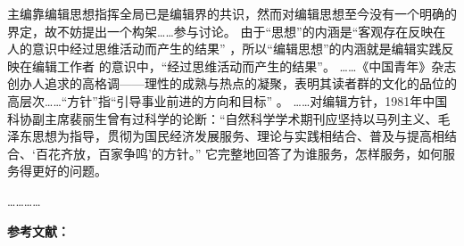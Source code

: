 \documentclass{article}
\newlength{\indentedpara}
\begin{document}
\pdfpagewidth=21cm \pdfpageheight=9.15cm
\begin{refsection}
\nocite{裴丽生1981-2-10,刘彻东1998-38-39,张忠智1997-33-34,中国社会科学院语言研究所词典编辑室1996--}

主编靠编辑思想指挥全局已是编辑界的共识\cite{张忠智1997-33-34}，然而对编辑思想至今没有一个明确的界定，故不妨提出一个构架……参与讨论。
由于“思想”的内涵是“客观存在反映在人的意识中经过思维活动而产生的结果”
，所以“编辑思想”的内涵就是编辑实践反映在编辑工作者
的意识中，“经过思维活动而产生的结果”。
……《中国青年》杂志创办人追求的高格调——理性的成熟与热点的凝聚\cite{刘彻东1998-38-39}，表明其读者群的文化的品位的高层次……“方针”指“引导事业前进的方向和目标”
。
……对编辑方针，1981年中国科协副主席裴丽生曾有过科学的论断：“自然科学学术期刊应坚持以马列主义、毛泽东思想为指导，贯彻为国民经济发展服务、理论与实践相结合、普及与提高相结合、‘百花齐放，百家争鸣’的方针。” \cite{裴丽生1981-2-10}它完整地回答了为谁服务，怎样服务，如何服务得更好的问题。

…………


\textbf{参考文献：}

\newrefcontext[sorting=none]{}
\parbox{2em}{}\parbox{\indentedpara}{\printbibliography[heading=none]}
\end{refsection}


\eject

\pdfpagewidth=21cm \pdfpageheight=4.75cm
\begin{refsection}

\nocite{尼葛洛庞帝1996--,汪冰1997-16-16,杨宗英1996-24-29,Baker1995--,Chernik1982--,Dowler1995-5-26}

\parbox{2em}{}\parbox{\indentedpara}{\printbibliography[heading=none]}
\end{refsection}

\eject

\pdfpagewidth=21cm \pdfpageheight=1cm
\begin{refsection}
\small\setlength{\bibitemsep}{0ex}
\nocite{帛画2023,anon1981-628}
\vspace{-2mm}
\parbox{2em}{}\parbox{\indentedpara}{\printbibliography[heading=none]}
\end{refsection}
\end{document}
